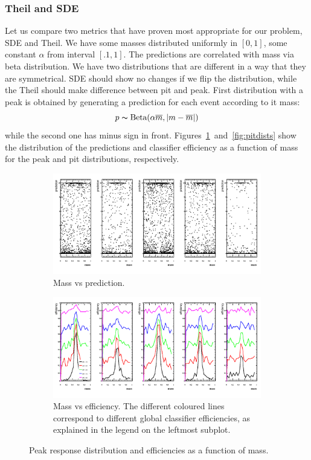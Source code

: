 \subsubsection{Theil and SDE}
Let us compare two metrics that have proven most appropriate for our problem, SDE and Theil. We have some masses distributed uniformly in $[0,1]$, some constant $\alpha$ from interval $[.1,1]$. The predictions are correlated with mass via beta distribution.
We have two distributions that are different in a way that they are symmetrical. SDE should show no changes if we flip the distribution, while the Theil should make difference between pit and peak. 
First distribution with a peak is obtained by generating a prediction for each event according to it mass:
\[
	p \thicksim \text{Beta}(\alpha \overline{m}, \left\vert m - \overline{m}\right\vert)
\]
while the second one has minus sign in front. Figures~\ref{fig:peakdists}~and~\ref{fig:pitdists} show the distribution of the predictions
and classifier efficiency as a function of mass for the peak and pit distributions, respectively. 
\begin{figure}[h]
\centering
		\begin{subfigure}[b]{0.95\textwidth}
			\includegraphics[width=\textwidth]{graphs/PeakDistributions.png}
			\caption{Mass vs prediction.}
		\end{subfigure}
		\begin{subfigure}[b]{0.95\textwidth}
			\includegraphics[width=\textwidth]{graphs/PeakEffs.png}
			\caption{Mass vs efficiency. The different coloured lines correspond to
				different global classifier efficiencies, as explained in the legend on the leftmost subplot.}
		\end{subfigure}
		\caption{Peak response distribution and efficiencies as a function of mass. \label{fig:peakdists}}
\end{figure}

